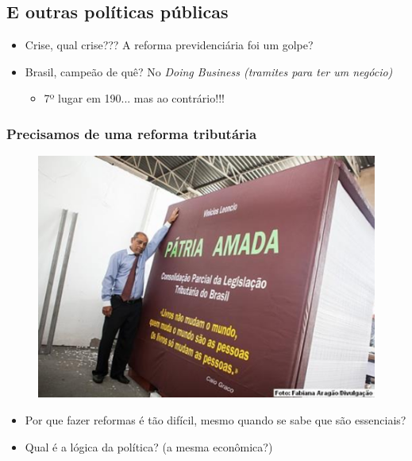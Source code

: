 \documentclass[a4paper,12pt]{article}[abntex2]
\begin{document}
\subsection{\textbf{E outras políticas públicas}}
\begin{itemize}
    \item Crise, qual crise??? A reforma previdenciária foi um golpe?
    \item Brasil, campeão de quê? No \textit{Doing Business (tramites para ter um negócio)} \begin{itemize}
        \item 7º lugar em 190... mas ao contrário!!!
    \end{itemize}
\end{itemize}

\subsubsection{\textbf{Precisamos de uma reforma tributária}}

\begin{figure}[H]
    \centering
    \includegraphics[width=0.5\linewidth]{Imagens/a1i1.png}
\end{figure}

\begin{itemize}
    \item Por que fazer reformas é tão difícil, mesmo quando se sabe que são essenciais? 
    \item Qual é a lógica da política? (a mesma econômica?)
\end{itemize}
\end{document}
